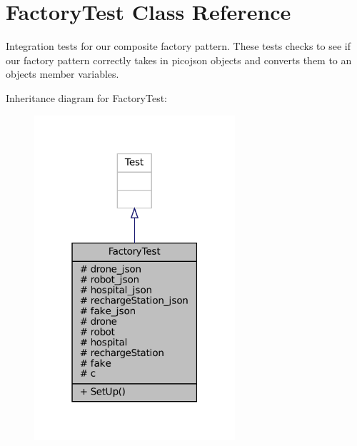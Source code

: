 \hypertarget{classFactoryTest}{}\section{Factory\+Test Class Reference}
\label{classFactoryTest}


Integration tests for our composite factory pattern. These tests checks to see if our factory pattern correctly takes in picojson objects and converts them to an object\textquotesingle{}s member variables.  




Inheritance diagram for Factory\+Test\+:\nopagebreak
\begin{figure}[H]
\begin{center}
\leavevmode
\includegraphics[width=211pt]{classFactoryTest__inherit__graph}
\end{center}
\end{figure}


